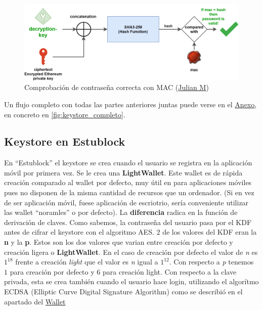 \begin{figure}[h!]
  \centering
  \includegraphics[width=0.8\linewidth]{figs/Desarrollo/Keystore/keystore_MAC}
  \caption[Comprobación de contraseña correcta con MAC]{Comprobación de contraseña correcta con MAC (\href{https://julien-maffre.medium.com/what-is-an-ethereum-keystore-file-86c8c5917b97}{Julian M})}
  \label{fig:keystore_MAC}
\end{figure}

Un flujo completo con todas las partes anteriores juntas puede verse en el \hyperref[cap:Anexo]{Anexo}, en concreto en \ref{fig:keystore_completo}.

\subsection{Keystore en Estublock}

En ``Estublock'' el keystore se crea cuando el usuario se registra en la aplicación móvil por primera vez. Se le crea una \textbf{LightWallet}. Este wallet es de rápida creación comparado al wallet por defecto, muy útil en para aplicaciones móviles pues no disponen de la misma cantidad de recursos que un ordenador. (Si en vez de ser aplicación móvil, fuese aplicación de escriotrio, sería conveniente utilizar las wallet ``noramles'' o por defecto). La \textbf{diferencia} radica en la función de derivación de claves. Como sabemos, la contraseña del usuario pasa por el KDF antes de cifrar el keystore con el algoritmo AES. 2 de los valores del KDF eran la \textbf{n} y la \textbf{p}. Estos son los dos valores que varian entre creación por defecto y creación ligera o \textbf{LightWallet}. En el caso de creación por defecto el valor de \emph{n} es $1^18$ frente a creación \emph{light} que el valor es \emph{n} igual a $1^12$. Con respecto a \emph{p} tenemos $1$ para creación por defecto y 6 para creación light. Con respecto a la clave privada, esta se crea también cuando el usuario hace login, utilizando el algorítmo ECDSA (Elliptic Curve Digital Signature Algorithm) como se describió en el apartado del \hyperref[sec:wallet]{Wallet} \\

